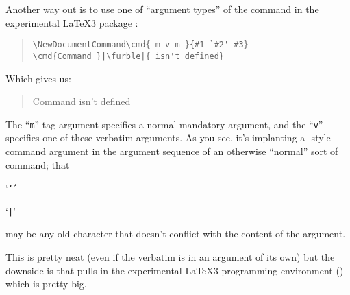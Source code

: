 Another way out is to use one of ``argument types'' of the
 command in the experimental \LaTeX{}3 package
:
\begin{quote}
\begin{verbatim}
\NewDocumentCommand\cmd{ m v m }{#1 `#2' #3}
\cmd{Command }|\furble|{ isn't defined}
\end{verbatim}
\end{quote}
Which gives us:
\begin{quote}
  Command  isn't defined
\end{quote}
The ``\texttt{m}'' tag argument specifies a normal mandatory argument,
and the ``\texttt{v}'' specifies one of these verbatim arguments.
As you see, it's implanting a -style command argument in the
argument sequence of an otherwise ``normal'' sort of command; that
\begin{typesetversion}
  `\texttt{\char`\|}'
\end{typesetversion}
\begin{htmlversion}
  `\texttt{|}' %
\end{htmlversion}
may be any old character that doesn't
conflict with the content of the argument.

This is pretty neat (even if the verbatim is in an argument of its
own) but the downside is that  pulls in
the experimental \LaTeX{}3 programming environment
() which is pretty big.

